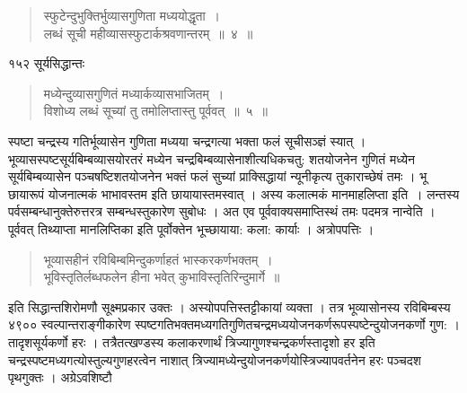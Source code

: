 \documentclass[11pt, openany]{book}
\begin{document}
\begin{quote}
  {\ssi स्फुटेन्दुभुक्तिर्भुव्यासगुणिता मध्ययोद्धृता~।\\
 लब्धं सूची महीव्यासस्फुटार्कश्रवणान्तरम्~॥~४~॥}
\end{quote}

\newpage





\noindent १५२ \hspace{4cm} सूर्यसिद्धान्तः
\vspace{1cm}


\begin{quote}
{\ssi मध्येन्दुव्यासगुणितं मध्यार्कव्यासभाजितम्~।\\
विशोध्य लब्धं सूच्यां तु तमोलिप्तास्तु पूर्ववत्~॥~५~॥}
\end{quote}

\begin{sloppypar}
 स्पष्टा चन्द्रस्य गतिर्भूव्यासेन गुणिता मध्यया चन्द्रगत्या भक्ता फलं सूचीसञ्ज्ञं स्यात् । भूव्यासस्पष्टसूर्यबिम्बव्यासयोरतरं मध्येन चन्द्रबिम्बव्यासेनाशीत्यधिकचतु: शतयोजनेन गुणितं मध्येन सूर्यबिम्बव्यासेन पञ्चषष्टिशतयोजनेन भक्तं फलं सुच्यां प्राक्सिद्धायां न्यूनीकृत्य तुकाराच्छेषं तमः । भू छायारूपं योजनात्मकं भाभावस्तम इति छायायास्तमस्वात् । अस्य कलात्मकं मानमाह\textendash लिप्ता इति~। लन्तस्य पर्वसम्बन्धानुक्तेरुत्तरत्र सम्बन्धस्तुकारेण सुबोधः । अत एव पूर्ववाक्यसमाप्तिस्थं तमः पदमत्र नान्वेति । पूर्ववत् तिथ्याप्ता मानलिप्तिका इति पूर्वोक्तेन भूच्छायाया: कला: कार्याः । अत्रोपपत्तिः ।
\end{sloppypar}


\begin{quote}
{\qt भूव्यासहीनं रविबिम्बमिन्दुकर्णाहतं भास्करकर्णभक्तम्~।\\
 भूविस्तृतिर्लब्धफलेन हीना भवेत् कुभाविस्तृतिरिन्दुमार्गे~॥}
\end{quote}

\begin{sloppypar}
इति सिद्धान्तशिरोमणौ सूक्ष्मप्रकार उक्तः । अस्योपपत्तिस्तट्टीकायां व्यक्ता । तत्र भूव्यासोनस्य रविबिम्बस्य ४९०० स्वल्पान्तराङ्गीकारेण स्पष्टगतिभक्तमध्यगतिगुणितचन्द्रमध्ययोजनकर्णरूपस्पष्टेन्दुयोजनकर्णो गुण: । तादृशसूर्यकर्णो हरः । तत्रैतत्खण्डस्य कलाकरणार्थं त्रिज्यागुणश्चन्द्रकर्णस्तादृशो हर इति चन्द्रस्पष्टमध्यगत्योस्तुल्यगुणहरत्वेन नाशात् त्रिज्यामध्येन्दुयोजनकर्णयोस्त्रिज्यापवर्तनेन हरः पञ्चदश पृथगुक्तः । अग्रेऽवशिष्टौ
\end{sloppypar}


\newpage
\end{document}
